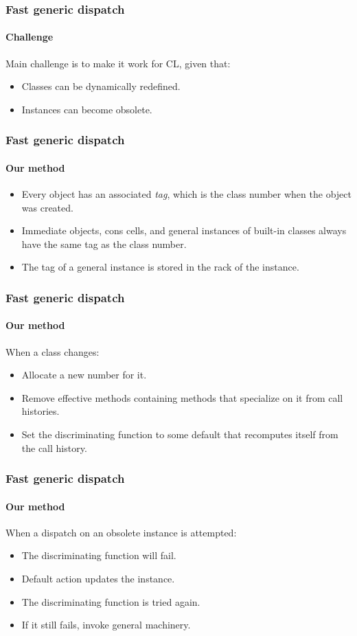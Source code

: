 \documentclass{beamer}
\begin{document}
\begin{frame}
  \frametitle{Fast generic dispatch}
  \framesubtitle{Challenge}

  Main challenge is to make it work for CL, given that:

  \begin{itemize}
  \item Classes can be dynamically redefined.
  \item Instances can become obsolete.
  \end{itemize}

\end{frame}
\begin{frame}
  \frametitle{Fast generic dispatch}
  \framesubtitle{Our method}

  \begin{itemize}
  \item Every object has an associated \emph{tag}, which is the class
    number when the object was created.
  \item Immediate objects, cons cells, and general instances of
    built-in classes always have the same tag as the class number.
  \item The tag of a general instance is stored in the rack of the
    instance. 
  \end{itemize}

\end{frame}
\begin{frame}
  \frametitle{Fast generic dispatch}
  \framesubtitle{Our method}

  When a class changes:

  \begin{itemize}
  \item Allocate a new number for it.
  \item Remove effective methods containing methods that specialize on
    it from call histories.
  \item Set the discriminating function to some default that
    recomputes itself from the call history.
  \end{itemize}

\end{frame}
\begin{frame}
  \frametitle{Fast generic dispatch}
  \framesubtitle{Our method}

  When a dispatch on an obsolete instance is attempted:

  \begin{itemize}
  \item The discriminating function will fail.
  \item Default action updates the instance. 
  \item The discriminating function is tried again.
  \item If it still fails, invoke general machinery.
  \end{itemize}

\end{frame}
\end{document}
